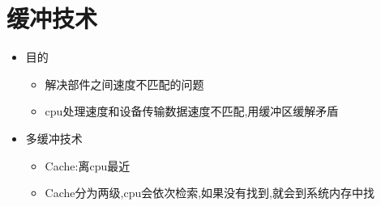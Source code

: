 \documentclass[a4paper,12pt,notitlepage]{article}
\begin{document}
\section{缓冲技术}
\begin{itemize}
	\item 目的
	\begin{itemize}
		\item 解决部件之间速度不匹配的问题
		\item cpu处理速度和设备传输数据速度不匹配,用缓冲区缓解矛盾
	\end{itemize}
	\item 多缓冲技术
	\begin{itemize}
		\item Cache:离cpu最近
		\item Cache分为两级,cpu会依次检索,如果没有找到,就会到系统内存中找
	\end{itemize}
\end{itemize}
\end{document}
